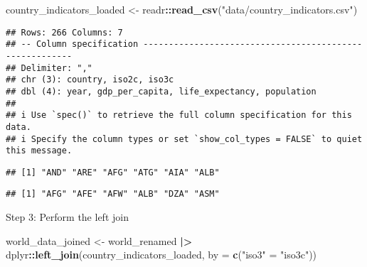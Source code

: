 \documentclass[
]{article}
\newenvironment{Shaded}{\begin{snugshade}}{\end{snugshade}}
\newcommand{\AttributeTok}[1]{\textcolor[rgb]{0.13,0.29,0.53}{#1}}
\newcommand{\FunctionTok}[1]{\textcolor[rgb]{0.13,0.29,0.53}{\textbf{#1}}}
\newcommand{\NormalTok}[1]{#1}
\newcommand{\OtherTok}[1]{\textcolor[rgb]{0.56,0.35,0.01}{#1}}
\newcommand{\SpecialCharTok}[1]{\textcolor[rgb]{0.81,0.36,0.00}{\textbf{#1}}}
\newcommand{\StringTok}[1]{\textcolor[rgb]{0.31,0.60,0.02}{#1}}
\begin{document}
\begin{Shaded}
\begin{Highlighting}[]
\NormalTok{country\_indicators\_loaded }\OtherTok{\textless{}{-}}\NormalTok{ readr}\SpecialCharTok{::}\FunctionTok{read\_csv}\NormalTok{(}\StringTok{"data/country\_indicators.csv"}\NormalTok{)}
\end{Highlighting}
\end{Shaded}

\begin{verbatim}
## Rows: 266 Columns: 7
## -- Column specification --------------------------------------------------------
## Delimiter: ","
## chr (3): country, iso2c, iso3c
## dbl (4): year, gdp_per_capita, life_expectancy, population
## 
## i Use `spec()` to retrieve the full column specification for this data.
## i Specify the column types or set `show_col_types = FALSE` to quiet this message.
\end{verbatim}

\begin{Shaded}
\end{Shaded}

\begin{verbatim}
## [1] "AND" "ARE" "AFG" "ATG" "AIA" "ALB"
\end{verbatim}

\begin{Shaded}
\end{Shaded}

\begin{verbatim}
## [1] "AFG" "AFE" "AFW" "ALB" "DZA" "ASM"
\end{verbatim}

Step 3: Perform the left join

\begin{Shaded}
\begin{Highlighting}[]
\NormalTok{world\_data\_joined }\OtherTok{\textless{}{-}}\NormalTok{ world\_renamed }\SpecialCharTok{|\textgreater{}} 
\NormalTok{  dplyr}\SpecialCharTok{::}\FunctionTok{left\_join}\NormalTok{(country\_indicators\_loaded, }\AttributeTok{by =} \FunctionTok{c}\NormalTok{(}\StringTok{"iso3"} \OtherTok{=} \StringTok{"iso3c"}\NormalTok{))}
\end{Highlighting}
\end{Shaded}
\end{document}
